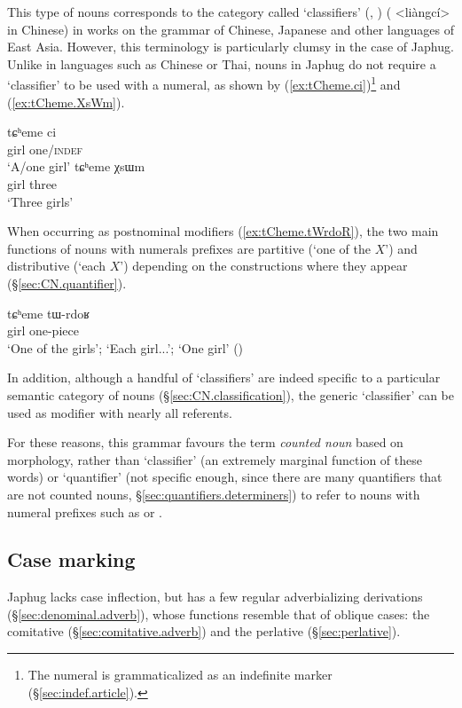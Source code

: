 This type of nouns corresponds to the category called `classifiers' (\citealt[518]{chao68chinese}, \citealt{aikhenvald00classifiers}) ( <liàngcí> in Chinese) in works on the grammar of Chinese, Japanese and other languages of East Asia. However, this terminology is particularly clumsy in the case of Japhug.  Unlike in languages such as Chinese or Thai, nouns in Japhug do not require a `classifier' to be used with a numeral, as shown by (\ref{ex:tCheme.ci})\footnote{The numeral  is grammaticalized as an indefinite marker (§\ref{sec:indef.article}).} and (\ref{ex:tCheme.XsWm}).


\begin{exe}
\ex \label{ex:tCheme.ci}
\gll tɕʰeme ci \\
girl one/\textsc{indef} \\
\glt `A/one girl'
\ex \label{ex:tCheme.XsWm}
\gll tɕʰeme χsɯm \\
girl three \\
\glt `Three girls'
\end{exe}

When occurring as postnominal modifiers (\ref{ex:tCheme.tWrdoR}), the two main functions of nouns with numerals prefixes are partitive (`one of the $X$') and distributive (`each $X$') depending on the constructions where they appear (§\ref{sec:CN.quantifier}). 

\begin{exe}
\ex \label{ex:tCheme.tWrdoR}
\gll tɕʰeme tɯ-rdoʁ \\
girl one-piece \\
\glt `One of the girls'; `Each girl...'; `One girl' ()
\end{exe}

In addition, although a handful of  `classifiers' are indeed specific to a particular semantic category of nouns (§\ref{sec:CN.classification}), the generic `classifier'  can be used as modifier with nearly all referents.

For these reasons, this grammar favours the term \textit{counted noun} based on morphology, rather than `classifier' (an extremely marginal function of these words) or `quantifier' (not specific enough, since there are many quantifiers that are not counted nouns, §\ref{sec:quantifiers.determiners}) to refer to nouns with numeral prefixes such as  or .

\subsection{Case marking} \label{sec:case.intro}
Japhug lacks case inflection, but has a few regular adverbializing derivations (§\ref{sec:denominal.adverb}), whose functions resemble that of oblique cases: the comitative  (§\ref{sec:comitative.adverb}) and the perlative (§\ref{sec:perlative}).

